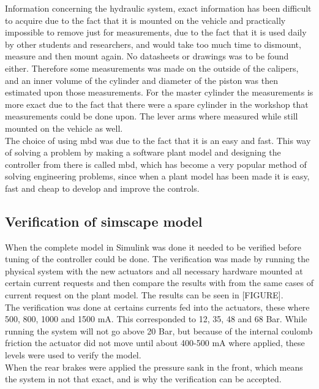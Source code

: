 \documentclass[a4paper,11pt]{kth-mag}
\begin{document}
Information concerning the hydraulic system, exact information has been difficult to acquire due to the fact that it is mounted on the vehicle and practically impossible to remove just for measurements, due to the fact that it is used daily by other students and researchers, and would take too much time to dismount, measure and then mount again. No datasheets or drawings was to be found either. Therefore some measurements was made on the outside of the calipers, and an inner volume of the cylinder and diameter of the piston was then estimated upon those measurements. For the master cylinder the measurements is more exact due to the fact that there were a spare cylinder in the workshop that measurements could be done upon. The lever arms where measured while still mounted on the vehicle as well. \\

The choice of using \gls{mbd} was due to the fact that it is an easy and fast. This way of solving a problem by making a software plant model and designing the controller from there is called \gls{mbd}, which has become a very popular method of solving engineering problems, since when a plant model has been made it is easy, fast and cheap to develop and improve the controls\cite{2010-01-1999}. 

\subsection{Verification of simscape model}
When the complete model in Simulink was done it needed to be verified before tuning of the controller could be done. The verification was made by running the physical system with the new actuators and all necessary hardware mounted at certain current requests and then compare the results with from the same cases of current request on the plant model. The results can be seen in [FIGURE]. \\



The verification was done at certains currents fed into the actuators, these where 500, 800, 1000 and 1500 mA. This corresponded to 12, 35, 48 and 68 Bar. While running the system will not go above 20 Bar, but because of the internal coulomb friction the actuator did not move until about 400-500 mA where applied, these levels were used to verify the model.\\

When the rear brakes were applied the pressure sank in the front, which means the system in not that exact, and is why the verification can be accepted. \\
\end{document}
